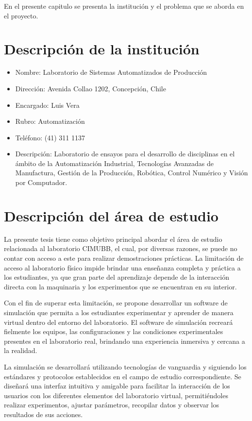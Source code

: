 En el presente capitulo se presenta la institución y el problema que se aborda en el proyecto.

\section{Descripción de la institución}
\begin{itemize}
\item Nombre: Laboratorio de Sistemas Automatizados de Producción
\item Dirección: Avenida Collao 1202, Concepción, Chile
\item Encargado: Luis Vera
\item Rubro: Automatización
\item Teléfono: (41) 311 1137
\item Descripción: Laboratorio de ensayos para el desarrollo de disciplinas en el ámbito de la Automatización Industrial, Tecnologías Avanzadas de Manufactura, Gestión de la Producción, Robótica, Control Numérico y Visión por Computador.
\end{itemize}

\section{Descripción del área de estudio}
La presente tesis tiene como objetivo principal abordar el área de estudio relacionada al laboratorio CIMUBB, el cual, por diversas razones, se puede no contar con acceso a este para realizar demostraciones prácticas. La limitación de acceso al laboratorio físico impide brindar una enseñanza completa y práctica a los estudiantes, ya que gran parte del aprendizaje depende de la interacción directa con la maquinaria y los experimentos que se encuentran en su interior.

Con el fin de superar esta limitación, se propone desarrollar un software de simulación que permita a los estudiantes experimentar y aprender de manera virtual dentro del entorno del laboratorio. El software de simulación recreará fielmente los equipos, las configuraciones y las condiciones experimentales presentes en el laboratorio real, brindando una experiencia inmersiva y cercana a la realidad.

La simulación se desarrollará utilizando tecnologías de vanguardia y siguiendo los estándares y protocolos establecidos en el campo de estudio correspondiente. Se diseñará una interfaz intuitiva y amigable para facilitar la interacción de los usuarios con los diferentes elementos del laboratorio virtual, permitiéndoles realizar experimentos, ajustar parámetros, recopilar datos y observar los resultados de sus acciones.

